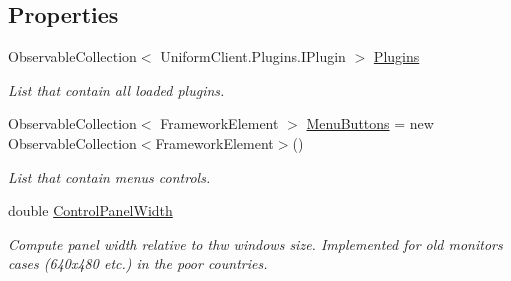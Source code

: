 \subsection*{Properties}
\begin{DoxyCompactItemize}
\item 
Observable\+Collection$<$ Uniform\+Client.\+Plugins.\+I\+Plugin $>$ \mbox{\hyperlink{class_teacher_handbook_1_1_main_window_a86e1ee1d12e39fbbd0bc0d7f32e36ad0}{Plugins}}
\begin{DoxyCompactList}\small\item\em List that contain all loaded plugins. \end{DoxyCompactList}\item 
Observable\+Collection$<$ Framework\+Element $>$ \mbox{\hyperlink{class_teacher_handbook_1_1_main_window_ada9d7a71ad01c470b09f6c62bf2afb7c}{Menu\+Buttons}} = new Observable\+Collection$<$Framework\+Element$>$()
\begin{DoxyCompactList}\small\item\em List that contain menu\textquotesingle{}s controls. \end{DoxyCompactList}\item 
double \mbox{\hyperlink{class_teacher_handbook_1_1_main_window_ad5d35ace4162888ef660d19eb3990626}{Control\+Panel\+Width}}
\begin{DoxyCompactList}\small\item\em Compute panel width relative to thw window\textquotesingle{}s size. Implemented for old monitors\textquotesingle{} cases (640x480 etc.) in the poor countries. \end{DoxyCompactList}\end{DoxyCompactItemize}
